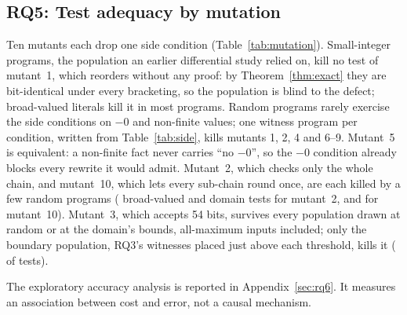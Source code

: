 \documentclass[acmsmall,review,anonymous,nonacm]{acmart}
\begin{document}
\subsection{RQ5: Test adequacy by mutation}\label{sec:rq5}
\begin{table}[t]
\caption{RQ5. Tests that kill each mutant (number of tests per population in
parentheses). A test kills a mutant when the mutant's strict-optimized output
differs from the correct unoptimized output.}\label{tab:mutation}
\centering\footnotesize\setlength{\tabcolsep}{3pt}\resizebox{\textwidth}{!}{}
\end{table}
Ten mutants each drop one side condition (Table~\ref{tab:mutation}).
Small-integer programs, the population an earlier differential study relied on,
kill no test of mutant~1, which reorders without any proof: by
Theorem~\ref{thm:exact} they are bit-identical under every bracketing, so the
population is blind to the defect; broad-valued literals kill it in most
programs. Random programs rarely exercise the side conditions on $-0$ and
non-finite values; one witness program per condition, written from
Table~\ref{tab:side}, kills mutants 1, 2, 4 and 6--9. Mutant~5 is equivalent: a
non-finite fact never carries ``no $-0$'', so the $-0$ condition already blocks
every rewrite it would admit. Mutant~2, which checks only the whole chain, and
mutant~10, which lets every sub-chain round once, are each killed by a few
random programs (\RqFiveKillTwoBroad{} broad-valued and \RqFiveKillTwoDomain{}
domain tests for mutant~2, \RqFiveKillOneZeroBroad{} and
\RqFiveKillOneZeroDomain{} for mutant~10). Mutant~3, which accepts 54 bits,
survives every population drawn at random or at the domain's bounds,
all-maximum inputs included; only the boundary population, RQ3's witnesses
placed just above each threshold, kills it (\RqFiveKillThreeBoundary{} of
\RqFiveTestsBoundary{} tests).

The exploratory accuracy analysis is reported in Appendix~\ref{sec:rq6}.
It measures an association between cost and error, not a causal mechanism.
\end{document}
